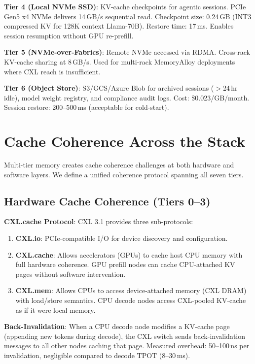 \documentclass[conference,10pt]{IEEEtran}
\begin{document}
\textbf{Tier 4 (Local NVMe SSD)}: KV-cache checkpoints for agentic sessions. PCIe Gen5 x4 NVMe delivers 14\,GB/s sequential read. Checkpoint size: 0.24\,GB (INT3 compressed KV for 128K context Llama-70B). Restore time: 17\,ms. Enables session resumption without GPU re-prefill.

\textbf{Tier 5 (NVMe-over-Fabrics)}: Remote NVMe accessed via RDMA. Cross-rack KV-cache sharing at 8\,GB/s. Used for multi-rack MemoryAlloy deployments where CXL reach is insufficient.

\textbf{Tier 6 (Object Store)}: S3/GCS/Azure Blob for archived sessions ($>$24\,hr idle), model weight registry, and compliance audit logs. Cost: \$0.023/GB/month. Session restore: 200--500\,ms (acceptable for cold-start).

\section{Cache Coherence Across the Stack}
\label{sec:coherence}

Multi-tier memory creates cache coherence challenges at both hardware and software layers. We define a unified coherence protocol spanning all seven tiers.

\subsection{Hardware Cache Coherence (Tiers 0--3)}

\textbf{CXL.cache Protocol}: CXL 3.1 provides three sub-protocols:
\begin{enumerate}
\item \textbf{CXL.io}: PCIe-compatible I/O for device discovery and configuration.
\item \textbf{CXL.cache}: Allows accelerators (GPUs) to cache host CPU memory with full hardware coherence. GPU prefill nodes can cache CPU-attached KV pages without software intervention.
\item \textbf{CXL.mem}: Allows CPUs to access device-attached memory (CXL DRAM) with load/store semantics. CPU decode nodes access CXL-pooled KV-cache as if it were local memory.
\end{enumerate}

\textbf{Back-Invalidation}: When a CPU decode node modifies a KV-cache page (appending new tokens during decode), the CXL switch sends back-invalidation messages to all other nodes caching that page. Measured overhead: 50--100\,ns per invalidation, negligible compared to decode TPOT (8--30\,ms).
\end{document}
